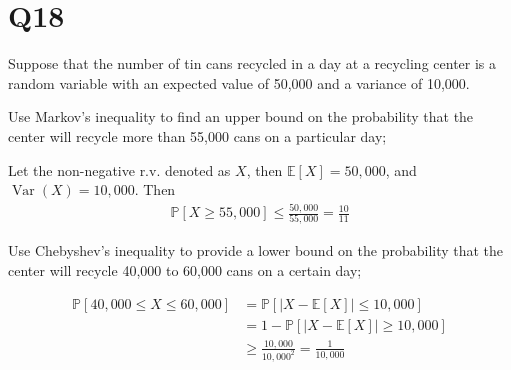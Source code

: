 \documentclass[11pt]{article}
\begin{document}
\begin{qparts}
\end{qparts}
\section*{Q18}
Suppose that the number of tin cans recycled in a day at a
recycling center is a random variable with an expected value of
50,000 and a variance of 10,000.
\begin{qparts}
    
    \item Use Markov's inequality to find an upper bound on the
    probability that the center will recycle more than 55,000 cans
    on a particular day;
    \begin{solution}
        Let the non-negative r.v. denoted as $X$, then $\mathbb{E}\left[ X \right]=50,000 $, and $\operatorname{Var}(X)=10,000$.
        Then 
        \begin{align*}
          \mathbb{P}\left[ X\ge 55,000 \right] \le \frac{50,000}{55,000}=\frac{10}{11}
        \end{align*}
    \end{solution}
    
    \item Use Chebyshev's inequality to provide a lower bound on the
    probability that the center will recycle 40,000 to 60,000 cans
    on a certain day;
    \begin{solution}
        \begin{align*}
            \mathbb{P}\left[ 40,000\le X\le 60,000 \right]
            &=\mathbb{P}\left[ \left\vert X-\mathbb{E}\left[ X \right]  \right\vert \le 10,000 \right]\\
            &=1-\mathbb{P}\left[ \left\vert X-\mathbb{E}\left[ X \right] \right\vert \ge 10,000  \right]\\
            &\ge \frac{10,000}{10,000^{2}}=\frac{1}{10,000}
        \end{align*}
    \end{solution}
\end{qparts}
\end{document}
